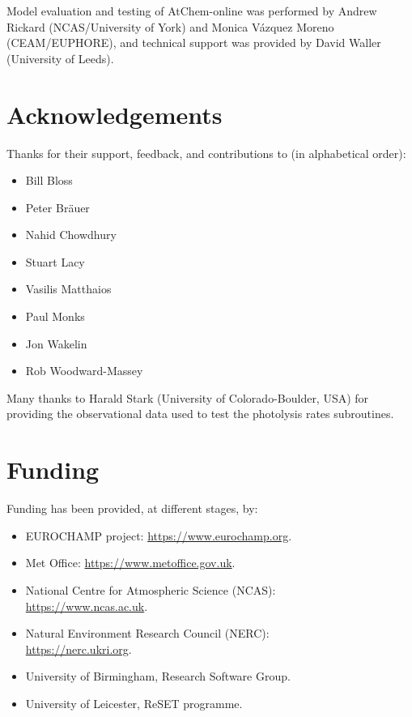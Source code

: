 Model evaluation and testing of AtChem-online was performed by Andrew
Rickard (NCAS/University of York) and Monica V{\'a}zquez Moreno
(CEAM/EUPHORE), and technical support was provided by David Waller
(University of Leeds).

\section{Acknowledgements} \label{sec:acknowledgements}

Thanks for their support, feedback, and contributions to (in
alphabetical order):

\begin{itemize}
\item Bill Bloss
\item Peter Br{\"a}uer
\item Nahid Chowdhury
\item Stuart Lacy
\item Vasilis Matthaios
\item Paul Monks
\item Jon Wakelin
\item Rob Woodward-Massey
\end{itemize}

Many thanks to Harald Stark (University of Colorado-Boulder, USA) for
providing the observational data used to test the photolysis rates
subroutines.

\section{Funding} \label{sec:funding}

Funding has been provided, at different stages, by:

\begin{itemize}
\item EUROCHAMP project: \url{https://www.eurochamp.org}.
\item Met Office: \url{https://www.metoffice.gov.uk}.
\item National Centre for Atmospheric Science (NCAS):\\ \url{https://www.ncas.ac.uk}.
\item Natural Environment Research Council (NERC):\\ \url{https://nerc.ukri.org}.
\item University of Birmingham, Research Software Group.
\item University of Leicester, ReSET programme.
\end{itemize}
